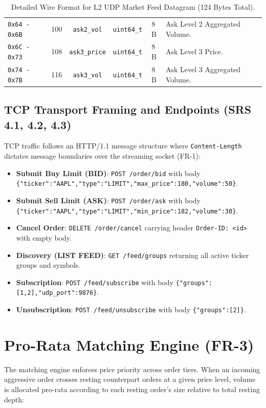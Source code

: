 \documentclass[11pt,a4paper]{article}
\begin{document}
\begin{table}[h!]
\begin{tabularx}{\textwidth}{lccccX}
\texttt{0x64 - 0x6B} & 100 & \texttt{ask2\_vol} & \texttt{uint64\_t} & 8\,B & Ask Level 2 Aggregated Volume. \\
\texttt{0x6C - 0x73} & 108 & \texttt{ask3\_price} & \texttt{uint64\_t} & 8\,B & Ask Level 3 Price. \\
\texttt{0x74 - 0x7B} & 116 & \texttt{ask3\_vol} & \texttt{uint64\_t} & 8\,B & Ask Level 3 Aggregated Volume. \\
\bottomrule
\end{tabularx}
\caption{Detailed Wire Format for L2 UDP Market Feed Datagram (124 Bytes Total).}
\label{tab:datagram}
\end{table}

\subsection{TCP Transport Framing and Endpoints (SRS 4.1, 4.2, 4.3)}
TCP traffic follows an HTTP/1.1 message structure where \texttt{Content-Length} dictates message boundaries over the streaming socket (FR-1):
\begin{itemize}
    \item \textbf{Submit Buy Limit (BID)}: \texttt{POST /order/bid} with body \texttt{\{"ticker":"AAPL","type":"LIMIT","max\_price":180,"volume":50\}}.
    \item \textbf{Submit Sell Limit (ASK)}: \texttt{POST /order/ask} with body \texttt{\{"ticker":"AAPL","type":"LIMIT","min\_price":182,"volume":30\}}.
    \item \textbf{Cancel Order}: \texttt{DELETE /order/cancel} carrying header \texttt{Order-ID: <id>} with empty body.
    \item \textbf{Discovery (LIST FEED)}: \texttt{GET /feed/groups} returning all active ticker groups and symbols.
    \item \textbf{Subscription}: \texttt{POST /feed/subscribe} with body \texttt{\{"groups":[1,2],"udp\_port":9876\}}.
    \item \textbf{Unsubscription}: \texttt{POST /feed/unsubscribe} with body \texttt{\{"groups":[2]\}}.
\end{itemize}

\section{Pro-Rata Matching Engine (FR-3)}

The matching engine enforces price priority across order tiers. When an incoming aggressive order crosses resting counterpart orders at a given price level, volume is allocated pro-rata according to each resting order's size relative to total resting depth:
\end{document}
